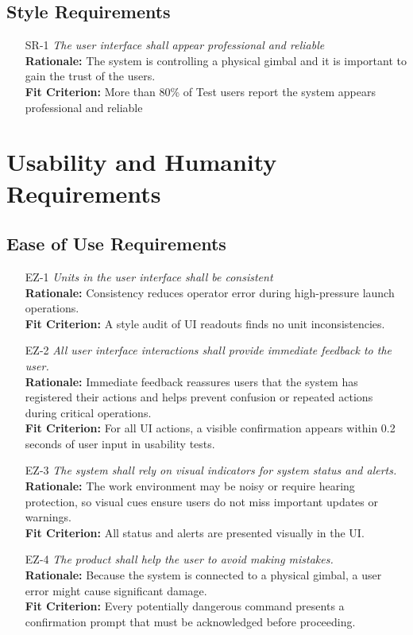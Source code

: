 \documentclass[12pt]{article}
\begin{document}
\subsection{Style Requirements}
\begin{itemize}[leftmargin=*]
  \item[SR-1] \emph{The user interface shall appear professional and reliable}\\[2mm]
        \textbf{Rationale:} The system is controlling a physical gimbal and it is important to gain the trust of the users.\\
        \textbf{Fit Criterion:} More than 80\% of Test users report the system appears professional and reliable
\end{itemize}

\section{Usability and Humanity Requirements}
\subsection{Ease of Use Requirements}
\begin{itemize}[leftmargin=*]
  \item[EZ-1] \emph{Units in the user interface shall be consistent}\\[2mm]
        \textbf{Rationale:} Consistency reduces operator error during high-pressure launch operations.\\
        \textbf{Fit Criterion:} A style audit of UI readouts finds no unit inconsistencies.

  \item[EZ-2] \emph{All user interface interactions shall provide immediate feedback to
          the user.}\\[2mm]
        \textbf{Rationale:} Immediate feedback reassures users that the system has registered their actions and helps prevent confusion or repeated actions during critical operations.\\
        \textbf{Fit Criterion:} For all UI actions, a visible confirmation appears within 0.2 seconds of user input in usability tests.

  \item[EZ-3] \emph{The system shall rely on visual indicators for system status and
          alerts.}\\[2mm]
        \textbf{Rationale:} The work environment may be noisy or require hearing protection, so visual cues ensure users do not miss important updates or warnings.\\
        \textbf{Fit Criterion:} All status and alerts are presented visually in the UI.
  \item[EZ-4] \emph{The product shall help the user to avoid making mistakes.}\\[2mm]
        \textbf{Rationale:} Because the system is connected to a physical gimbal, a user error might cause significant damage.\\
        \textbf{Fit Criterion:} Every potentially dangerous command presents a confirmation prompt that must be acknowledged before proceeding.
\end{itemize}
\end{document}
